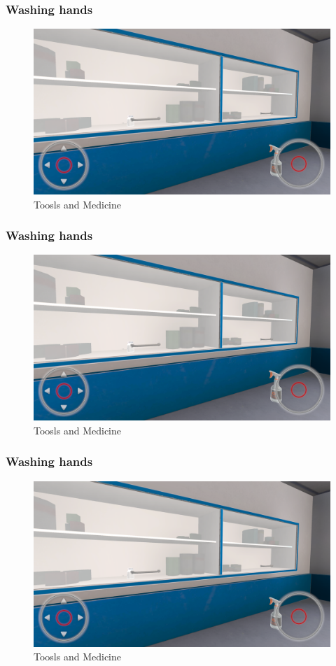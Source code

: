 \subsubsection{Washing hands}
\begin{figure}[h]
	\centering
	\includegraphics[width=0.65\linewidth]{Images/Toosls and Medicine.png}
	\caption{Toosls and Medicine}
	\label{fig:system-diagram}
\end{figure}

\subsubsection{Washing hands}
\begin{figure}[h]
	\centering
	\includegraphics[width=0.65\linewidth]{Images/Toosls and Medicine.png}
	\caption{Toosls and Medicine}
	\label{fig:system-diagram}
\end{figure}

\subsubsection{Washing hands}
\begin{figure}[h]
	\centering
	\includegraphics[width=0.65\linewidth]{Images/Toosls and Medicine.png}
	\caption{Toosls and Medicine}
	\label{fig:system-diagram}
\end{figure}

